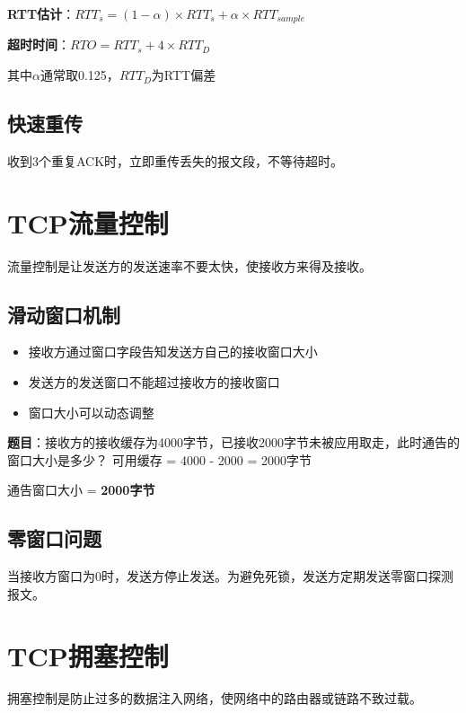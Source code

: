 \begin{formulabox}
\textbf{RTT估计}：$RTT_s = (1-\alpha) \times RTT_s + \alpha \times RTT_{sample}$

\textbf{超时时间}：$RTO = RTT_s + 4 \times RTT_D$

其中$\alpha$通常取0.125，$RTT_D$为RTT偏差
\end{formulabox}

\subsection{快速重传}
收到3个重复ACK时，立即重传丢失的报文段，不等待超时。

\section{TCP流量控制}
流量控制是让发送方的发送速率不要太快，使接收方来得及接收。

\subsection{滑动窗口机制}
\begin{itemize}[leftmargin=2em,itemsep=0pt]
    \item 接收方通过窗口字段告知发送方自己的接收窗口大小
    \item 发送方的发送窗口不能超过接收方的接收窗口
    \item 窗口大小可以动态调整
\end{itemize}

\begin{examplebox}[例题5.2 流量控制]
\textbf{题目}：接收方的接收缓存为4000字节，已接收2000字节未被应用取走，此时通告的窗口大小是多少？
\tcblower
可用缓存 = 4000 - 2000 = 2000字节

通告窗口大小 = \textbf{2000字节}
\end{examplebox}

\subsection{零窗口问题}
当接收方窗口为0时，发送方停止发送。为避免死锁，发送方定期发送零窗口探测报文。

\section{TCP拥塞控制}
拥塞控制是防止过多的数据注入网络，使网络中的路由器或链路不致过载。

